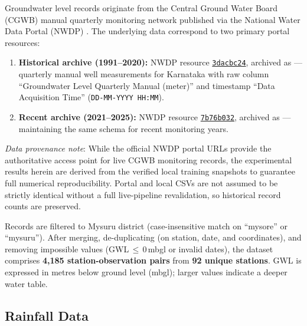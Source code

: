 \documentclass[conference]{IEEEtran}
\begin{document}
Groundwater level records originate from the Central Ground Water Board
(CGWB) manual quarterly monitoring network published via the
National Water Data Portal (NWDP) \cite{cgwb_data}.
The underlying data correspond to two primary portal resources:
\begin{enumerate}\setlength{\itemsep}{1pt}\setlength{\parskip}{0pt}
  \item \textbf{Historical archive (1991--2020):}
        NWDP resource
        \href{https://nwdp.nwic.gov.in/dataset/gwl-manual-quarterly-central-ground-water-board-department/resource/3dacbc24-b45c-4ffe-8099-f69728ca711b}{\texttt{3dacbc24}},
        archived as
         ---
        quarterly manual well measurements for Karnataka with
        raw column ``Groundwater Level Quarterly Manual (meter)'' and
        timestamp ``Data Acquisition Time''
        (\texttt{DD-MM-YYYY HH:MM}).
  \item \textbf{Recent archive (2021--2025):}
        NWDP resource
        \href{https://nwdp.nwic.gov.in/dataset/gwl-manual-quarterly-central-ground-water-board-department/resource/7b76b032-99a5-4725-8ab5-125346e7aebf}{\texttt{7b76b032}},
        archived as
         ---
        maintaining the same schema for recent monitoring years.
\end{enumerate}
\emph{Data provenance note}: While the official NWDP portal URLs
provide the authoritative access point for live CGWB monitoring records,
the experimental results herein are derived from the verified local
training snapshots to guarantee full numerical reproducibility.
Portal and local CSVs are not assumed to be strictly identical without a
full live-pipeline revalidation, so historical record counts are preserved.

Records are filtered to Mysuru district (case-insensitive match on
``mysore'' or ``mysuru'').
After merging, de-duplicating (on station, date, and coordinates),
and removing impossible values (GWL\,$\leq$\,0\,mbgl or invalid
dates), the dataset comprises \textbf{4,185 station-observation
pairs} from \textbf{92 unique stations}.
GWL is expressed in metres below ground level (mbgl);
larger values indicate a deeper water table.

\subsection{Rainfall Data}
\end{document}
